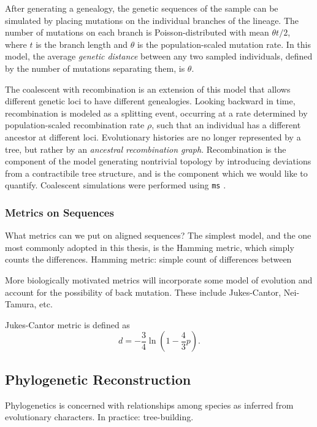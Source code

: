 After generating a genealogy, the genetic sequences of the sample can be simulated by placing mutations on the individual branches of the lineage.
The number of mutations on each branch is Poisson-distributed with mean $\theta t / 2$, where $t$ is the branch length and $\theta$ is the population-scaled mutation rate.
In this model, the average \emph{genetic distance} between any two sampled individuals, defined by the number of mutations separating them, is $\theta$.

The coalescent with recombination is an extension of this model that allows different genetic loci to have different genealogies.
Looking backward in time, recombination is modeled as a splitting event, occurring at a rate determined by population-scaled recombination rate $\rho$, such that an individual has a different ancestor at different loci.
Evolutionary histories are no longer represented by a tree, but rather by an \emph{ancestral recombination graph}.
Recombination is the component of the model generating nontrivial topology by introducing deviations from a contractibile tree structure, and is the component which we would like to quantify.
Coalescent simulations were performed using \texttt{ms} \cite{Hudson:2002}.

\subsubsection{Metrics on Sequences}

What metrics can we put on aligned sequences?
The simplest model, and the one most commonly adopted in this thesis, is the Hamming metric, which simply counts the differences.
Hamming metric: simple count of differences between

More biologically motivated metrics will incorporate some model of evolution and account for the possibility of back mutation.
These include Jukes-Cantor, Nei-Tamura, etc.

Jukes-Cantor metric is defined as 
\begin{equation}
d=-\frac{3}{4}\ln(1-\frac{4}{3}p).
\end{equation}

\subsection{Phylogenetic Reconstruction}

Phylogenetics is concerned with relationships among species as inferred from evolutionary characters.
In practice: tree-building.

